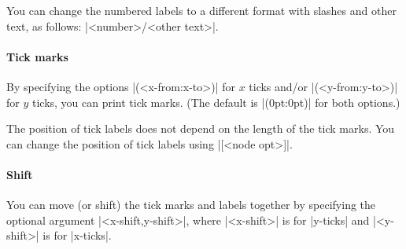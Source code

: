 You can change the numbered labels to a different format with slashes and other text, as follows: |<number>/<other text>|.

\begin{tzcode}{.3}
\end{tzcode}

\paragraph{Tick marks}
By specifying the options |(<x-from:x-to>)| for $x$ ticks and/or |(<y-from:y-to>)| for $y$ ticks, you can print tick marks. (The default is |(0pt:0pt)| for both options.)

\begin{tzcode}{.3}
\end{tzcode}

The position of tick labels does not depend on the length of the tick marks.
You can change the position of tick labels using |[<node opt>]|.

\begin{tzcode}{.3}
\end{tzcode}

\paragraph{Shift}

You can move (or shift) the tick marks and labels together by specifying the optional argument |<x-shift,y-shift>|, where |<x-shift>| is for |y-ticks| and |<y-shift>| is for |x-ticks|.

